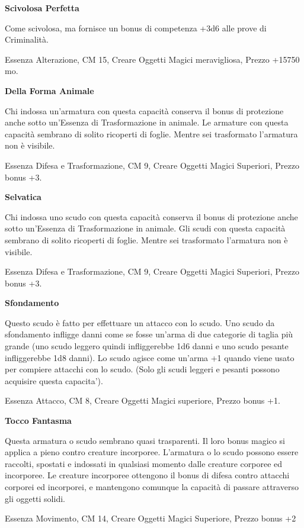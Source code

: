 \documentclass[a4paper,11pt,twoside,openany]{book}
\begin{document}
\textbf{Scivolosa Perfetta}

Come scivolosa, ma fornisce un bonus di competenza +3d6 alle prove di Criminalità.

Essenza Alterazione, CM 15, Creare Oggetti Magici meravigliosa, Prezzo +15750 mo.

\textbf{Della Forma Animale}

Chi indossa un'armatura con questa capacità conserva il bonus di protezione anche sotto un'Essenza di Trasformazione in animale. Le armature con questa capacità sembrano di solito ricoperti di foglie. Mentre sei trasformato l'armatura non è visibile.

Essenza Difesa e Trasformazione, CM 9, Creare Oggetti Magici Superiori, Prezzo bonus +3.

\textbf{Selvatica}

Chi indossa uno scudo con questa capacità conserva il bonus di protezione anche sotto un'Essenza di Trasformazione in animale. Gli scudi con questa capacità sembrano di solito ricoperti di foglie. Mentre sei trasformato l'armatura non è visibile.

Essenza Difesa e Trasformazione, CM 9, Creare Oggetti Magici Superiori, Prezzo bonus +3.

\textbf{Sfondamento}

Questo scudo è fatto per effettuare un attacco con lo scudo. Uno scudo da sfondamento infligge danni come se fosse un'arma di due categorie di taglia più grande (uno scudo leggero quindi infliggerebbe 1d6 danni e uno scudo pesante infliggerebbe 1d8 danni). Lo scudo agisce come un'arma +1 quando viene usato per compiere attacchi con lo scudo. (Solo gli scudi leggeri e pesanti possono acquisire questa capacita').

Essenza Attacco, CM 8, Creare Oggetti Magici superiore, Prezzo bonus +1.

\textbf{Tocco Fantasma}

Questa armatura o scudo sembrano quasi trasparenti. Il loro bonus magico si applica a pieno contro creature incorporee. L'armatura o lo scudo possono essere raccolti, spostati e indossati in qualsiasi momento dalle creature corporee ed incorporee. Le creature incorporee ottengono il bonus di difesa contro attacchi corporei ed incorporei, e mantengono comunque la capacità di passare attraverso gli oggetti solidi.

Essenza Movimento, CM 14, Creare Oggetti Magici Superiore, Prezzo bonus +2
\end{document}
